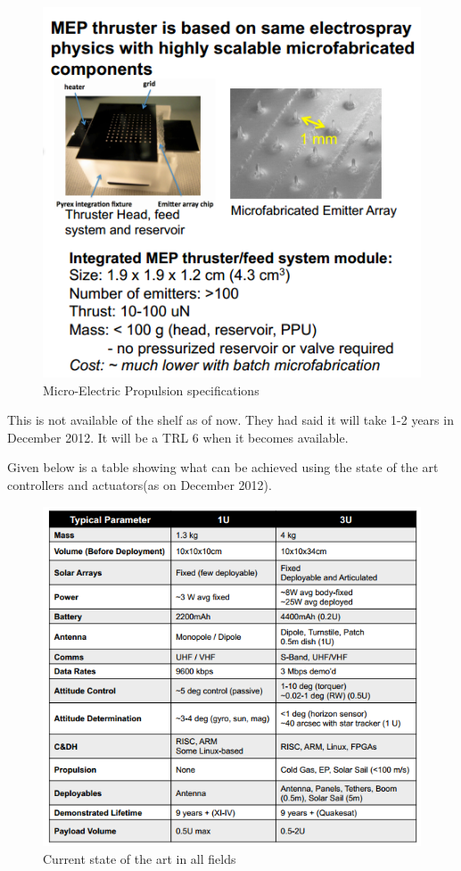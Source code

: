 \begin{figure}[!ht]
\begin{center}
\includegraphics[scale=0.7]{MEP_prop.png}
\caption{Micro-Electric Propulsion specifications}
\end{center}
\end{figure}
\newpage
This is not available of the shelf as of now. They had said it will take 1-2 years in December 2012. It will be a TRL 6 when it becomes available.  

Given below is a table showing what can be achieved using the state of the art controllers and actuators(as on December 2012). 

\begin{figure}[!ht]
\begin{center}
\includegraphics[scale=0.7]{state_of_art.png}
\caption{Current state of the art in all fields}
\end{center}
\end{figure}
\newpage